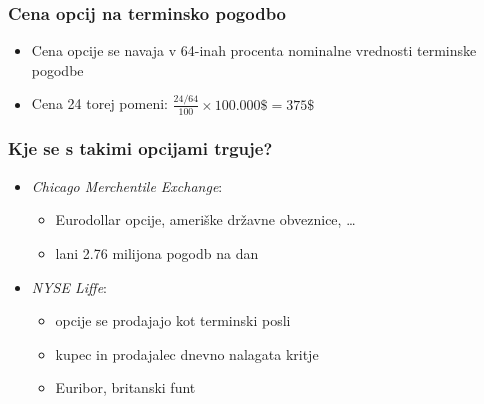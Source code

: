 \documentclass[14pt]{beamer}
\begin{document}
%    
%

\begin{frame}
    \frametitle{Cena opcij na terminsko pogodbo}
    \begin{itemize}
        \item Cena opcije se navaja v 64-inah procenta nominalne vrednosti terminske pogodbe
        \item Cena 24 torej pomeni: $\frac{24/64}{100}\times 100.000\$ = 375\$$
    \end{itemize}
\end{frame}

\begin{frame}
    \frametitle{Kje se s takimi opcijami trguje?}
        \begin{itemize}
            \item \textit{Chicago Merchentile Exchange}:
                \begin{itemize}
                    \item Eurodollar opcije, ameriške državne obveznice, \ldots
                    \item lani 2.76 milijona pogodb na dan
                \end{itemize}
            \item \textit{NYSE Liffe}:
                \begin{itemize}
                    \item opcije se prodajajo kot terminski posli
                    \item kupec in prodajalec dnevno nalagata kritje
                    \item Euribor, britanski funt
                \end{itemize}
        \end{itemize}
\end{frame}
\end{document}
